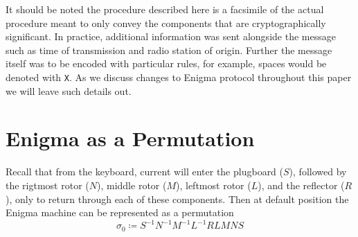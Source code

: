 \noindent It should be noted the procedure described here is a
facsimile of the actual procedure meant to only convey the components
that are cryptographically significant. In practice, additional
information was sent alongside the message such as time of
transmission and radio station of origin. Further the message itself
was to be encoded with particular rules, for example, spaces would be
denoted with \texttt{X}. As we discuss changes to Enigma protocol
throughout this paper we will leave such details out.


\section{Enigma as a Permutation}

Recall that from the keyboard, current will enter the plugboard
($S$), followed by the rigtmost rotor ($N$), middle
rotor ($M$), leftmost rotor ($L$), and the reflector ($R$), only to
return through each of these components. Then at default position the
Enigma machine can be represented as a permutation
\[
  \sigma_0 \coloneq S^{-1}N^{-1}M^{-1}L^{-1}RLMNS
\]

